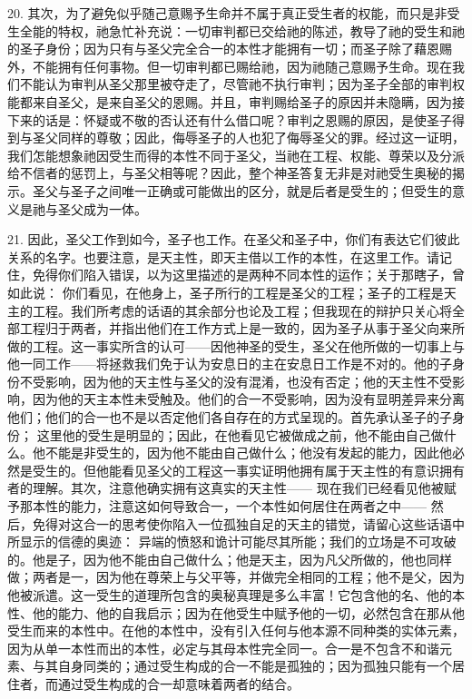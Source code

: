 20. 其次，为了避免似乎随己意赐予生命并不属于真正受生者的权能，而只是非受生全能的特权，祂急忙补充说：一切审判都已交给祂的陈述，教导了祂的受生和祂的圣子身份；因为只有与圣父完全合一的本性才能拥有一切；而圣子除了藉恩赐外，不能拥有任何事物。但一切审判都已赐给祂，因为祂随己意赐予生命。现在我们不能认为审判从圣父那里被夺走了，尽管祂不执行审判；因为圣子全部的审判权能都来自圣父，是来自圣父的恩赐。并且，审判赐给圣子的原因并未隐瞒，因为接下来的话是：怀疑或不敬的否认还有什么借口呢？审判之恩赐的原因，是使圣子得到与圣父同样的尊敬；因此，侮辱圣子的人也犯了侮辱圣父的罪。经过这一证明，我们怎能想象祂因受生而得的本性不同于圣父，当祂在工程、权能、尊荣以及分派给不信者的惩罚上，与圣父相等呢？因此，整个神圣答复无非是对祂受生奥秘的揭示。圣父与圣子之间唯一正确或可能做出的区分，就是后者是受生的；但受生的意义是祂与圣父成为一体。\par

21. 因此，圣父工作到如今，圣子也工作。在圣父和圣子中，你们有表达它们彼此关系的名字。也要注意，是天主性，即天主借以工作的本性，在这里工作。请记住，免得你们陷入错误，以为这里描述的是两种不同本性的运作；关于那瞎子，曾如此说： 你们看见，在他身上，圣子所行的工程是圣父的工程；圣子的工程是天主的工程。我们所考虑的话语的其余部分也论及工程；但我现在的辩护只关心将全部工程归于两者，并指出他们在工作方式上是一致的，因为圣子从事于圣父向来所做的工程。这一事实所含的认可——因他神圣的受生，圣父在他所做的一切事上与他一同工作——将拯救我们免于认为安息日的主在安息日工作是不对的。他的子身份不受影响，因为他的天主性与圣父的没有混淆，也没有否定；他的天主性不受影响，因为他的天主本性未受触及。他们的合一不受影响，因为没有显明差异来分离他们；他们的合一也不是以否定他们各自存在的方式呈现的。首先承认圣子的子身份； 这里他的受生是明显的；因此，在他看见它被做成之前，他不能由自己做什么。他不能是非受生的，因为他不能由自己做什么；他没有发起的能力，因此他必然是受生的。但他能看见圣父的工程这一事实证明他拥有属于天主性的有意识拥有者的理解。其次，注意他确实拥有这真实的天主性—— 现在我们已经看见他被赋予那本性的能力，注意这如何导致合一，一个本性如何居住在两者之中—— 然后，免得对这合一的思考使你陷入一位孤独自足的天主的错觉，请留心这些话语中所显示的信德的奥迹： 异端的愤怒和诡计可能尽其所能；我们的立场是不可攻破的。他是子，因为他不能由自己做什么；他是天主，因为凡父所做的，他也同样做；两者是一，因为他在尊荣上与父平等，并做完全相同的工程；他不是父，因为他被派遣。这一受生的道理所包含的奥秘真理是多么丰富！它包含他的名、他的本性、他的能力、他的自我启示；因为在他受生中赋予他的一切，必然包含在那从他受生而来的本性中。在他的本性中，没有引入任何与他本源不同种类的实体元素，因为从单一本性而出的本性，必定与其母本性完全同一。合一是不包含不和谐元素、与其自身同类的；通过受生构成的合一不能是孤独的；因为孤独只能有一个居住者，而通过受生构成的合一却意味着两者的结合。\par

